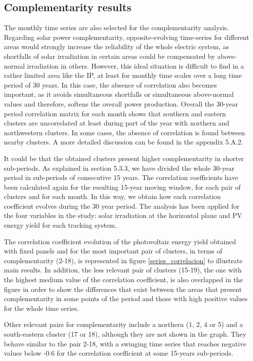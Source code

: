 \subsection{Complementarity results}

The monthly time series are also selected for the complementarity analysis.
Regarding solar power complementarity, opposite-evolving time-series for different areas would strongly increase the reliability of the whole electric system, as shortfalls of solar irradiation in certain areas could be compensated by above-normal irradiation in others. However, this ideal situation is difficult to find in a rather limited area like the IP, at least for monthly time scales over a long time period of 30 years. In this case, the absence of correlation also becomes important, as it avoids simultaneous shortfalls or simultaneous above-normal values and therefore, softens the overall power production. Overall the 30-year period correlation matrix for each month shows that southern and eastern clusters are uncorrelated at least during part of the year with northern and northwestern clusters. In some cases, the absence of correlation is found between nearby clusters. A more detailed discussion can be found in the appendix 5.A.2.

It could be that the obtained clusters present higher complementarity in shorter sub-periods. As explained in section 5.3.3, we have divided the whole 30-year period in sub-periods of consecutive 15 years. The correlation coefficients have been calculated again for the resulting 15-year moving window, for each pair of clusters and for each month. In this way, we obtain how each correlation coefficient evolves during the 30 year period. The analysis has been applied for the four variables in the study: solar irradiation at the horizontal plane and PV energy yield for each tracking system.

The correlation coefficient evolution of the photovoltaic energy yield obtained with fixed panels and for the most important pair of clusters, in terms of complementarity (2-18), is represented in figure \ref{series_correlacion} to illustrate main results. In addition, the less relevant pair of clusters (15-19), the one with the highest medium value of the correlation coefficient, is also overlapped in the figure in order to show the differences that exist between the areas that present complementarity in some points of the period and those with high positive values for the whole time series.

Other relevant pairs for complementarity include a northern (1, 2, 4 or 5) and a south-eastern cluster (17 or 18),  although they are not shown in the graph. They behave similar to the pair 2-18, with a swinging time series that reaches negative values below -0.6 for the correlation coefficient at some 15-years sub-periods. 

